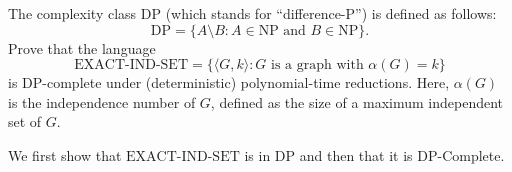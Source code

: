 \documentclass[12pt]{article}
\begin{document}


\begin{problem}{1}
    The complexity class $\mathrm{DP}$ (which stands for “difference-P”) is defined as follows:
    \[ \mathrm{DP} = \{ A \setminus B : A \in \mathrm{NP} \text{ and } B \in \mathrm{NP} \}.\]
    Prove that the language
    \[ \text{EXACT-IND-SET} = \{ \langle G, k \rangle : G \text{ is a graph with } \alpha(G) = k \} \]
    is $\mathrm{DP}$-complete under (deterministic) polynomial-time reductions. Here, $\alpha(G)$ is the independence number of $G$, defined as the size of a maximum independent set of $G$.
\end{problem}

\begin{solution}
    We first show that $\text{EXACT-IND-SET}$ is in DP and then that it is DP-Complete. \\
    

\end{solution}
\end{document}
